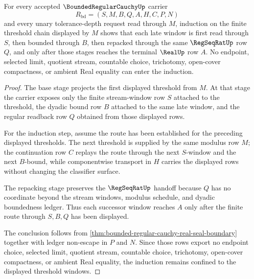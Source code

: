 \begin{theorem}
\label{thm:bounded-regular-cauchy-tail-window-induction}
For every accepted $\BoundedRegularCauchyUp$ carrier
$$
R_{\mathrm{bd}}=(S,M,B,Q,A,H,C,P,N)
$$
and every unary tolerance-depth request read through $M$, induction on the finite threshold chain displayed by $M$ shows that each late window is first read through $S$, then bounded through $B$, then repacked through the same $\RegSeqRatUp$ row $Q$, and only after those stages reaches the terminal $\RealUp$ row $A$. No endpoint, selected limit, quotient stream, countable choice, trichotomy, open-cover compactness, or ambient Real equality can enter the induction.
\end{theorem}
\begin{proof}
The base stage projects the first displayed threshold from $M$. At that stage the carrier exposes only the finite stream-window row $S$ attached to the threshold, the dyadic bound row $B$ attached to the same late window, and the regular readback row $Q$ obtained from those displayed rows.

For the induction step, assume the route has been established for the preceding displayed thresholds. The next threshold is supplied by the same modulus row $M$; the continuation row $C$ replays the route through the next $S$-window and the next $B$-bound, while componentwise transport in $H$ carries the displayed rows without changing the classifier surface.

The repacking stage preserves the $\RegSeqRatUp$ handoff because $Q$ has no coordinate beyond the stream windows, modulus schedule, and dyadic boundedness ledger. Thus each successor window reaches $A$ only after the finite route through $S,B,Q$ has been displayed.

The conclusion follows from \autoref{thm:bounded-regular-cauchy-real-seal-boundary} together with ledger non-escape in $P$ and $N$. Since those rows export no endpoint choice, selected limit, quotient stream, countable choice, trichotomy, open-cover compactness, or ambient Real equality, the induction remains confined to the displayed threshold windows.
\end{proof}

